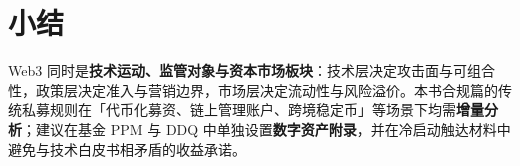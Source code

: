 \section{小结}

Web3 同时是\textbf{技术运动、监管对象与资本市场板块}：技术层决定攻击面与可组合性，政策层决定准入与营销边界，市场层决定流动性与风险溢价。本书合规篇的传统私募规则在「代币化募资、链上管理账户、跨境稳定币」等场景下均需\textbf{增量分析}；建议在基金 PPM 与 DDQ 中单独设置\textbf{数字资产附录}，并在冷启动触达材料中避免与技术白皮书相矛盾的收益承诺。

